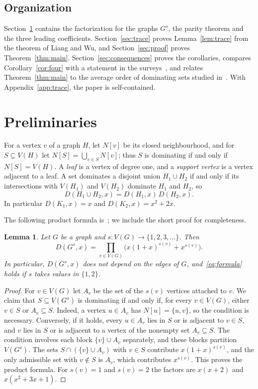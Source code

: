 \documentclass{amsart}
\newtheorem{lemma}[theorem]{Lemma}
\theoremstyle{definition}
\theoremstyle{remark}
\numberwithin{equation}{section}
\begin{document}
\subsection*{Organization}
Section~\ref{sec:prelim} contains the factorization for the graphs $G^s$, the parity theorem and the three leading coefficients. Section~\ref{sec:trace} proves Lemma~\ref{lem:trace} from the theorem of Liang and Wu, and Section~\ref{sec:proof} proves Theorem~\ref{thm:main}. Section~\ref{sec:consequences} proves the corollaries, compares Corollary~\ref{cor:four} with a statement in the surveys~\cite{Ali11s,Ali13}, and relates Theorem~\ref{thm:main} to the average order of dominating sets studied in~\cite{BC24}. With Appendix~\ref{app:trace}, the paper is self-contained.

\section{Preliminaries}\label{sec:prelim}

For a vertex $v$ of a graph $H$, let $N[v]$ be its closed neighbourhood, and for $S\subseteq V(H)$ let $N[S]=\bigcup_{v\in S}N[v]$; thus $S$ is dominating if and only if $N[S]=V(H)$. A \emph{leaf} is a vertex of degree one, and a \emph{support vertex} is a vertex adjacent to a leaf. A set dominates a disjoint union $H_1\cup H_2$ if and only if its intersections with $V(H_1)$ and $V(H_2)$ dominate $H_1$ and $H_2$, so
\begin{equation}\label{eq:mult}
D(H_1\cup H_2,x)=D(H_1,x)\,D(H_2,x).
\end{equation}
In particular $D(K_1,x)=x$ and $D(K_2,x)=x^2+2x$.

The following product formula is~\cite[Theorem~3]{Obo16}; we include the short proof for completeness.

\begin{lemma}\label{lem:factor}
Let $G$ be a graph and $s\colon V(G)\to\{1,2,3,\dots\}$. Then
\[
D(G^s,x)=\prod_{v\in V(G)}\bigl(x(1+x)^{s(v)}+x^{s(v)}\bigr).
\]
In particular, $D(G^s,x)$ does not depend on the edges of $G$, and~\eqref{eq:formula} holds if $s$ takes values in $\{1,2\}$.
\end{lemma}

\begin{proof}
For $v\in V(G)$ let $A_v$ be the set of the $s(v)$ vertices attached to $v$. We claim that $S\subseteq V(G^s)$ is dominating if and only if, for every $v\in V(G)$, either $v\in S$ or $A_v\subseteq S$. Indeed, a vertex $u\in A_v$ has $N[u]=\{u,v\}$, so the condition is necessary. Conversely, if it holds, every $u\in A_v$ lies in $S$ or is adjacent to $v\in S$, and $v$ lies in $S$ or is adjacent to a vertex of the nonempty set $A_v\subseteq S$. The condition involves each block $\{v\}\cup A_v$ separately, and these blocks partition $V(G^s)$. The sets $S\cap(\{v\}\cup A_v)$ with $v\in S$ contribute $x(1+x)^{s(v)}$, and the only admissible set with $v\notin S$ is $A_v$, which contributes $x^{s(v)}$. This proves the product formula. For $s(v)=1$ and $s(v)=2$ the factors are $x(x+2)$ and $x(x^2+3x+1)$.
\end{proof}
\end{document}
